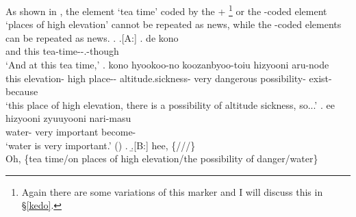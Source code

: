 %
As shown in \Next,
the element  `tea time' coded by the  + %
	\footnote{
	Again there are some variations of this marker
	and I will discuss this in \S \ref{kedo}.
	}
or the -coded element  `places of high elevation'
cannot be repeated as news,
while the -coded elements can be repeated as news.
%
\ex. \a.[A:] \ag. de kono  \\
		and this tea-time--.-though \\
		`And at this tea time,'
	\bg. kono hyookoo-no   koozanbyoo-toiu hizyooni   aru-node \\
		this elevation- high place-- altitude.sickness- very dangerous possibility- exist-because \\
		`this place of high elevation, there is a possibility of altitude sickness, so...'
	\bg. ee  hizyooni zyuuyooni nari-masu \\
		 water- very important become- \\
		`water is very important.'
		 \hfill{()}
	\z.
\b.[B:] hee, \{///\} \\
	Oh, \{tea time/on places of high elevation/the possibility of danger/water\}


%
%
%
%

